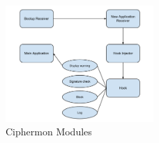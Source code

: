 
\begin{figure}[hb]
  \centering
  \includegraphics[width=0.5\textwidth]{img/ciphermon}
  \caption{Ciphermon Modules}
  \label{fig:ciphermon}
\end{figure}
